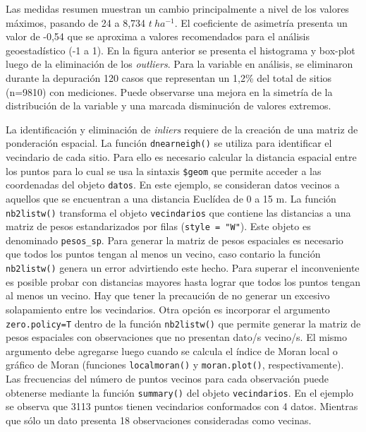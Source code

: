 \documentclass[11pt,b5paper,]{krantz}
\begin{document}
Las medidas resumen muestran un cambio principalmente a nivel de los valores máximos, pasando de 24 a 8,734 \(t\ ha^{-1}\). El coeficiente de asimetría presenta un valor de -0,54 que se aproxima a valores recomendados para el análisis geoestadístico (-1 a 1). En la figura anterior se presenta el histograma y box-plot luego de la eliminación de los \emph{outliers}. Para la variable en análisis, se eliminaron durante la depuración 120 casos que representan un 1,2\% del total de sitios (n=9810) con mediciones. Puede observarse una mejora en la simetría de la distribución de la variable y una marcada disminución de valores extremos.

La identificación y eliminación de \emph{inliers} requiere de la creación de una matriz de ponderación espacial. La función \texttt{dnearneigh()} se utiliza para identificar el vecindario de cada sitio. Para ello es necesario calcular la distancia espacial entre los puntos para lo cual se usa la sintaxis \texttt{\$geom} que permite acceder a las coordenadas del objeto \texttt{datos}. En este ejemplo, se consideran datos vecinos a aquellos que se encuentran a una distancia Euclídea de 0 a 15 m. La función \texttt{nb2listw()} transforma el objeto \texttt{vecindarios} que contiene las distancias a una matriz de pesos estandarizados por filas (\texttt{style\ =\ "W"}). Este objeto es denominado \texttt{pesos\_sp}. Para generar la matriz de pesos espaciales es necesario que todos los puntos tengan al menos un vecino, caso contario la función \texttt{nb2listw()} genera un error advirtiendo este hecho. Para superar el inconveniente es posible probar con distancias mayores hasta lograr que todos los puntos tengan al menos un vecino. Hay que tener la precaución de no generar un excesivo solapamiento entre los vecindarios. Otra opción es incorporar el argumento \texttt{zero.policy=T} dentro de la función \texttt{nb2listw()} que permite generar la matriz de pesos espaciales con observaciones que no presentan dato/s vecino/s. El mismo argumento debe agregarse luego cuando se calcula el índice de Moran local o gráfico de Moran (funciones \texttt{localmoran()} y \texttt{moran.plot()}, respectivamente). Las frecuencias del número de puntos vecinos para cada observación puede obtenerse mediante la función \texttt{summary()} del objeto \texttt{vecindarios}. En el ejemplo se observa que 3113 puntos tienen vecindarios conformados con 4 datos. Mientras que sólo un dato presenta 18 observaciones consideradas como vecinas.
\end{document}
